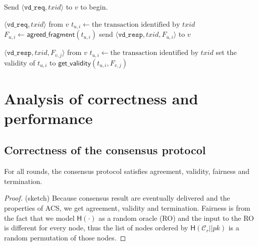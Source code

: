 \documentclass{beamer}
\newcommand{\C}{\mathcal{C}}
\begin{document}
\begin{frame}{\subsecname}
Send $\langle \texttt{vd\_req}, txid \rangle$ to $v$ to begin.
\vspace{5 mm}
\begin{algorithmic}
    \Upon $\langle \texttt{vd\_req}, txid \rangle$ from $v$
        \State $t_{u, i} \gets \text{the transaction identified by } txid$
        \State $F_{u, i} \gets \textsf{agreed\_fragment}(t_{u, i})$
        \State send $\langle \texttt{vd\_resp}, txid, F_{u, i} \rangle$ to $v$

    \Upon $\langle \texttt{vd\_resp}, txid, F_{v, j} \rangle$ from $v$
        \State $t_{u, i} \gets \text{the transaction identified by } txid$
        \State set the validity of $t_{u, i}$ to $\textsf{get\_validity}(t_{u, i}, F_{v, j})$
\end{algorithmic}
\end{frame}

\section{Analysis of correctness and performance}

\subsection{Correctness of the consensus protocol}
\begin{frame}{\subsecname}
\begin{theorem}
For all rounds,
the consensus protocol satisfies agreement, validity, fairness and termination.
\end{theorem}
\begin{proof}(sketch)
Because consensus result are eventually delivered and the properties of ACS,
we get agreement, validity and termination.
Fairness is from the fact that we model $\textsf{H}(\cdot)$ as a random oracle (RO) and the input to the RO is different for every node,
thus the list of nodes ordered by $\textsf{H}(\C_r || pk )$ is a random permutation of those nodes.
\end{proof}
\end{frame}
\end{document}
